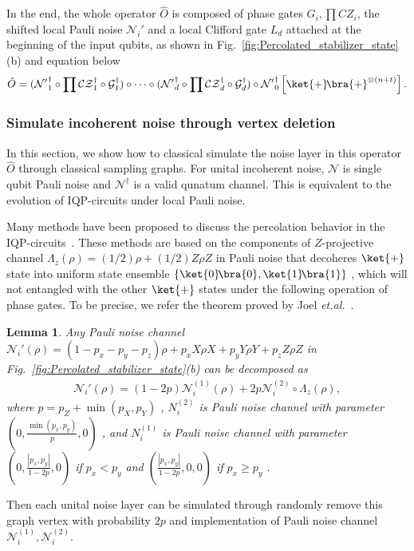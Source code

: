 \documentclass[aps,%
twocolumn,%
floatfix,%
pra,%
amsfonts,%
longbibliography,%
groupedaddress,%
superscriptaddress]{revtex4-2}%
\newtheorem{lemma}{Lemma}
\newcommand{\1}{\mathbbm{1}}
\begin{document}
In the end, the whole operator $\hat O$ is composed of phase gates $G_i, \prod CZ_i$, the shifted local Pauli noise $\mathcal{N}_i'$ and a local Clifford gate $L_d$ attached at the beginning of the input qubits, as shown in Fig.~\ref{fig:Percolated_stabilizer_state}(b) and equation below
\begin{align}
\label{eq:conjugated_amplitude_diagonal}
    \hat O=  (\mathcal{N'}_1^\dagger\circ \prod\mathcal{CZ}_1^\dagger\circ \mathcal{G}_1^\dagger)\circ \cdots\circ(\mathcal{N'}_d^\dagger\circ \prod\mathcal{CZ}_d^\dagger\circ \mathcal{G}_d^\dagger)\circ \mathcal{N'}_0^\dagger\left[ \ket{+}\!\bra{+}^{\otimes (n+t)} \right].
\end{align}

\subsubsection{Simulate incoherent noise through vertex deletion}
In this section, we show how to classical simulate the noise layer in this operator $\hat O$  through classical sampling graphs.
For unital incoherent noise, $\mathcal{N}$ is single qubit Pauli noise and $\mathcal{N}^\dagger$ is a valid qunatum channel.
This is equivalent to the evolution of IQP-circuits under local Pauli noise.

Many methods have been proposed to discuss the percolation behavior in the IQP-circuits~\cite{nelson2024polynomial,rajakumar2024polynomialtimeclassicalsimulationnoisy}. These methods are based on the components of $Z$-projective channel $\Lambda_z(\rho) = ({1}/{2})\rho+({1}/{2})Z\rho Z$ in Pauli noise that decoheres $\ket{+}$ state into uniform state ensemble $\{\ket{0}\!\bra{0}, \ket{1}\!\bra{1}\}$ , which will not entangled with the other $\ket{+}$  states under the following operation of phase gates. To be precise, we refer the theorem proved by Joel \emph{et.al.}~\cite{rajakumar2025polynomial}. 
\begin{lemma} \label{lemma:z-projective_of_Paulinoise}
    Any Pauli noise channel $\mathcal{N}_i'(\rho) = (1 - p_x-p_y-p_z)\rho +p_x X\rho X + p_y Y\rho Y + p_z Z\rho Z$ in Fig.~\ref{fig:Percolated_stabilizer_state}(b) can be decomposed as
    \begin{align}
        \mathcal{N}_{i}'(\rho) = (1 - 2p)\mathcal{N}_i^{(1)}(\rho) + 2p\mathcal{N}_i^{(2)} \circ \Lambda_z(\rho),
    \end{align}
    where $p = p_Z + \min(p_X,p_Y)$ , $N^{(2)}_i$ is Pauli noise channel with parameter $(0,\frac{\min(p_x, p_y)}{p},0)$  , and  $N^{(1)}_i$ is Pauli noise channel with parameter $(0,\frac{|p_x, p_y|}{1 - 2p},0)$ if $p_x < p_y$ and $(\frac{|p_x, p_y|}{1 - 2p},0,0)$ if $p_x \geq p_y$ .
\end{lemma}
Then each unital noise layer can be simulated through randomly remove this graph vertex with probability $2p$ and implementation of Pauli noise channel $\mathcal{N}_i^{(1)},\mathcal{N}_i^{(2)}$.
\end{document}
